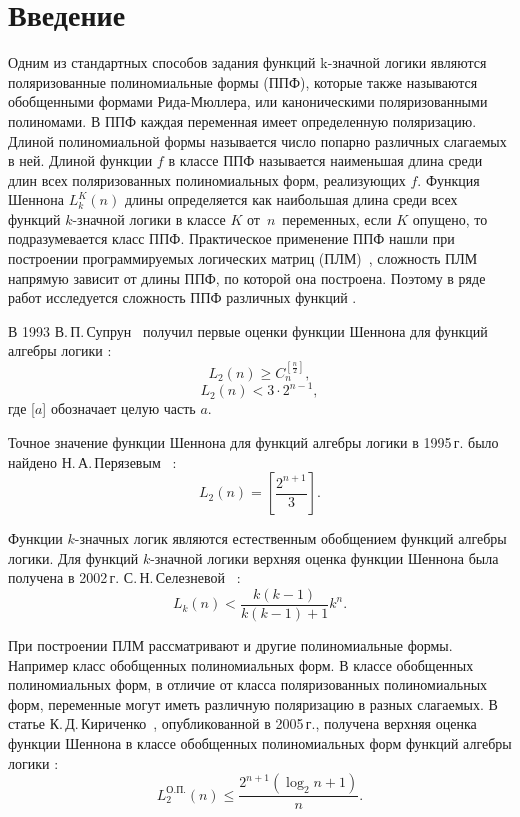 \documentclass[bibliography=totoc, a4paper, 14pt]{extarticle}
\let\stdsection\section
\renewcommand\section{\newpage\stdsection}
\begin{document}
\setcounter{page}{3}
\setcounter{secnumdepth}{-1}

\tableofcontents

\section{Введение}
Одним из стандартных способов задания функций k\nobreakdash-значной логики являются поляризованные
полиномиальные формы (ППФ), которые также называются обобщенными формами Рида-Мюллера, или
каноническими поляризованными полиномами. В ППФ каждая переменная имеет определенную поляризацию.
Длиной полиномиальной формы называется число попарно различных слагаемых в ней. Длиной функции $f$
в классе ППФ называется наименьшая длина среди длин всех поляризованных полиномиальных форм,
реализующих $f$. Функция Шеннона $L^K_k(n)$ длины определяется как наибольшая длина среди всех
функций $k$\nobreakdash-значной логики в классе $K$ от~$n$~переменных, если $K$ опущено, то
подразумевается класс ППФ. Практическое применение ППФ нашли при построении программируемых
логических матриц (ПЛМ)~\cite{ue04, sb90}, сложность ПЛМ напрямую зависит от длины ППФ, по которой
она построена. Поэтому в ряде работ исследуется сложность ППФ различных функций
\cite{sv93,pn95,ss02,kk05,sd08,mn12,sm09}.

В 1993  В.\,П.\,Супрун~\cite{sv93} получил первые оценки функции Шеннона для функций алгебры логики :
$$
L_2(n) \geqslant C_n^{[\frac{n}{2}]},
$$
$$
L_2(n) < 3 \cdot 2^{n-1},
$$
где [$a$] обозначает целую часть $a$.

Точное значение функции Шеннона для функций алгебры логики в 1995\,г. было
найдено Н.\,А.\,Перязевым~\cite{pn95} :
$$
L_2(n) = \left[\frac{2^{n+1}}{3}\right].
$$

Функции $k$\nobreakdash-значных логик являются естественным обобщением функций алгебры логики.
Для функций $k$\nobreakdash-значной логики верхняя оценка функции Шеннона была получена в 2002\,г. С.\,Н.\,Селезневой~\cite{ss02} :
$$
L_k(n) < \frac{k(k-1)}{k(k-1)+1}k^n.
$$

При построении ПЛМ рассматривают и другие полиномиальные формы. Например класс обобщенных полиномиальных форм.
В классе обобщенных полиномиальных форм, в отличие от класса поляризованных полиномиальных форм, переменные могут иметь
различную поляризацию в разных слагаемых. В статье К.\,Д.\,Кириченко~\cite{kk05}, опубликованной в 2005\,г., получена верхняя оценка
функции Шеннона в классе обобщенных полиномиальных форм функций алгебры логики :
$$
L^{\text{О.П.}}_2(n) \leqslant \frac{2 ^ {n + 1}(\log_2n+1)}{n}.
$$
\end{document}
